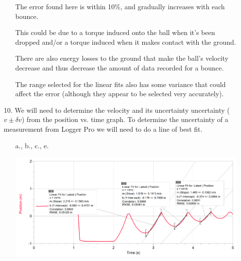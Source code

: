 \documentclass[12pt, letterpaper]{article}
\begin{document}
\begin{enumerate}
\begin{itemize}
\begin{mdframed}
                The error found here is within 10\%, and gradually increases with each bounce. 
                
                This could be due to a torque induced onto the ball when it's been dropped and/or a torque induced when it makes contact with the ground. 
                
                There are also energy losses to the ground that make the ball's velocity decrease and thus decrease the amount of data recorded for a bounce. 
                
                The range selected for the linear fits also has some variance that could affect the error (although they appear to be selected very accurately).
            \end{mdframed}
        \end{itemize}

        \pagebreak

        \item[10.] We will need to determine the velocity and its uncertainty uncertainty ($v \pm \delta v$) from the position vs. time graph. To determine the uncertainty of a measurement from Logger Pro we will need to do a line of best fit.
        
        \begin{itemize}

            \item [a., b., c., e.]\mbox{}
            
            \begin{mdframed}
                \begin{center}
                    \includegraphics[width=\textwidth]{image5.png}

                \end{center}
            \end{mdframed}
        \end{itemize}


\end{enumerate}
\end{document}

